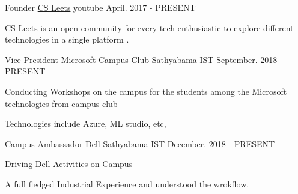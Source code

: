 

\begin{cventries}

  \cventry
    {Founder} %
    {\href{https://www.youtube.com/watch?v=hhXW7aLtbSI&t=1s}{CS Leets}} %
    {youtube} %
    {April. 2017 - PRESENT} %
    {
      \begin{cvitems} %
        \item {CS Leets is an open community for every tech enthusiastic to explore different technologies in a single platform .}
      \end{cvitems}
    }

  \cventry
    {Vice-President} %
    {Microsoft Campus Club} %
    {Sathyabama IST} %
    {September. 2018 - PRESENT} %
    {
      \begin{cvitems} %
        \item {Conducting Workshops on the campus for the students among the Microsoft technologies from campus club }
        \item {Technologies include Azure, ML studio, etc,}
      \end{cvitems}
    }


  \cventry
    {Campus Ambassador} %
    {Dell} %
    {Sathyabama IST} %
    {December. 2018 - PRESENT} %
    {
      \begin{cvitems} %
        \item {Driving Dell Activities on Campus}
        \item {A full fledged Industrial Experience and understood the wrokflow.}
      \end{cvitems}
    }

\end{cventries}
